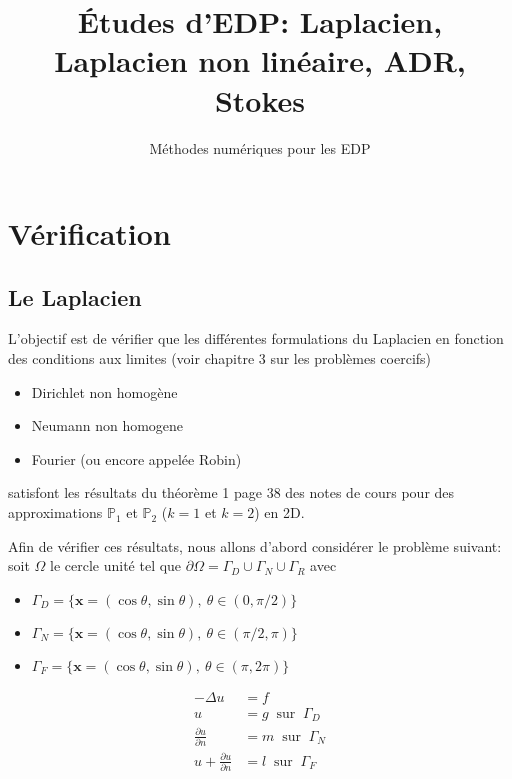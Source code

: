 \documentclass[11pt,utf8]{article}
\title{Études d'EDP: Laplacien, Laplacien non linéaire, ADR, Stokes}
\author{Méthodes numériques pour les EDP}
\date{}
\begin{document}
\maketitle

\section{Vérification}
\label{sec:verification-1}


\subsection{Le Laplacien}
\label{sec:le-laplacian}


L'objectif est de vérifier que les différentes formulations du Laplacien en
fonction des conditions aux limites (voir chapitre 3 sur les problèmes
coercifs)
\begin{itemize}
\item Dirichlet non homogène
\item Neumann non homogene
\item Fourier (ou encore appelée Robin)
\end{itemize}
satisfont les résultats du théorème 1 page 38 des notes de cours pour des approximations $\mathbb{P}_1$ et
$\mathbb{P}_2$ ($k=1$ et $k=2$) en 2D.

Afin de vérifier ces résultats, nous allons d'abord considérer le problème suivant:
soit $\Omega$ le cercle unité tel que $\partial \Omega = \Gamma_D \cup
\Gamma_N \cup \Gamma_R$ avec
\begin{itemize}
\item $\Gamma_D = \{\mathbf{x} = (\cos\theta,\sin\theta),\ \theta \in (0,\pi/2) \}$
\item $\Gamma_N = \{\mathbf{x} = (\cos\theta,\sin\theta),\ \theta \in (\pi/2,\pi) \}$
\item $\Gamma_F = \{\mathbf{x} = (\cos\theta,\sin\theta),\ \theta \in (\pi,2\pi) \}$
\end{itemize}

\begin{equation}
  \label{eq:3}
  \begin{split}
    -\Delta u &= f\\
    u &= g\ \mbox{ sur }\ \Gamma_D\\
    \frac{\partial u}{\partial n} &= m\ \mbox{ sur }\ \Gamma_N\\
    u + \frac{\partial u}{\partial n} &= l\ \mbox{ sur }\ \Gamma_F\\
  \end{split}
\end{equation}
\end{document}
